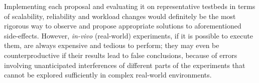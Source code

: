 Implementing each proposal and evaluating it on representative
testbeds in terms of scalability, reliability and workload changes
would definitely be the most rigorous way to observe and propose
appropriate solutions to aforementioned
side-effects.
However, \textit{in-vivo} (\ie real-world) experiments, if it is
possible to execute them, are always expensive and tedious to perform;
they may even be counterproductive if their results lead to false
conclusions, \eg because of errors involving unanticipated
interferences of different parts of the experiments that cannot be
explored sufficiently in complex real-world environments.

